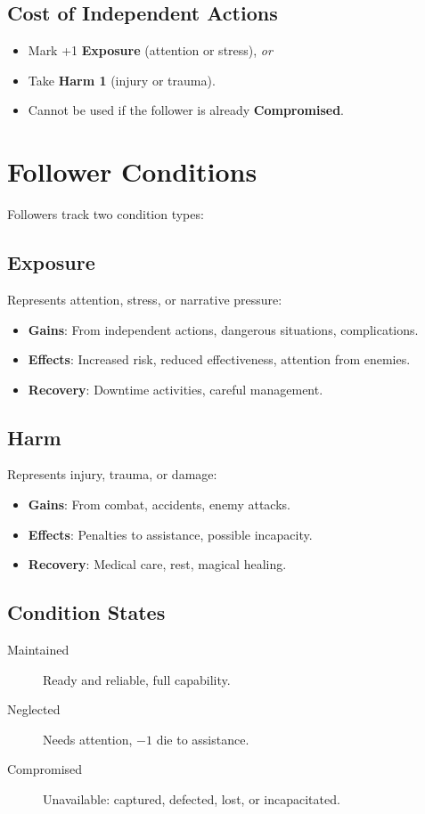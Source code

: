 \subsection*{Cost of Independent Actions}
\begin{itemize}
\item Mark +1 \textbf{Exposure} (attention or stress), \emph{or}
\item Take \textbf{Harm 1} (injury or trauma).
\item Cannot be used if the follower is already \textbf{Compromised}.
\end{itemize}

\section{Follower Conditions}

Followers track two condition types:

\subsection*{Exposure}
Represents attention, stress, or narrative pressure:
\begin{itemize}
\item \textbf{Gains}: From independent actions, dangerous situations, complications.
\item \textbf{Effects}: Increased risk, reduced effectiveness, attention from enemies.
\item \textbf{Recovery}: Downtime activities, careful management.
\end{itemize}

\subsection*{Harm}
Represents injury, trauma, or damage:
\begin{itemize}
\item \textbf{Gains}: From combat, accidents, enemy attacks.
\item \textbf{Effects}: Penalties to assistance, possible incapacity.
\item \textbf{Recovery}: Medical care, rest, magical healing.
\end{itemize}

\subsection*{Condition States}
\begin{description}
\item[Maintained] Ready and reliable, full capability.
\item[Neglected] Needs attention, $-1$ die to assistance.
\item[Compromised] Unavailable: captured, defected, lost, or incapacitated.
\end{description}

